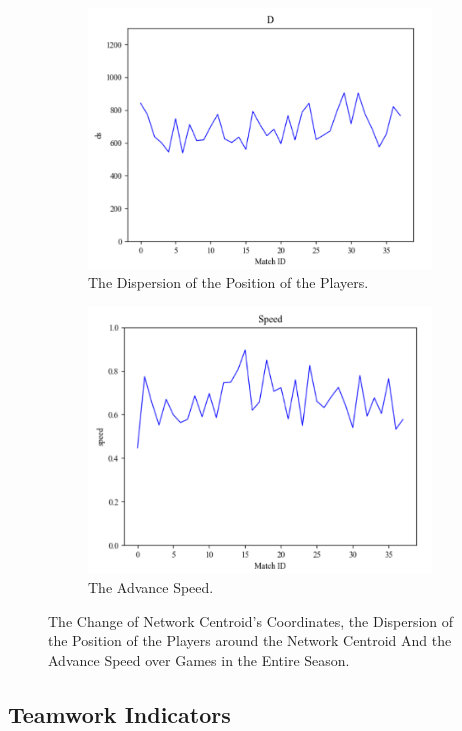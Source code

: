\documentclass{mcmthesis}
\begin{document}
\begin{figure}[h]
\begin{subfigure}[b]{0.5\textwidth}
			\includegraphics[width=\textwidth]{figures/d2.png}
			\caption{The Dispersion of the Position of the Players.}
			\label{fig:d2}
		\end{subfigure}%
		\begin{subfigure}[b]{0.5\textwidth}
			\includegraphics[width=\textwidth]{figures/s2.png}
			\caption{The Advance Speed.}
			\label{fig:s2}
		\end{subfigure}
		\caption{The Change of Network Centroid's Coordinates, the Dispersion of the Position of the Players around the Network Centroid And the Advance Speed over Games in the Entire Season.}\label{fig:season}
	\end{figure}
\subsection{Teamwork Indicators}
\end{document}
